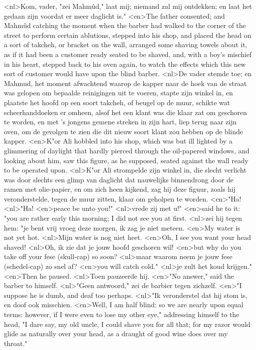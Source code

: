 <nl>Kom, vader, "zei Mahmûd," laat mij; niemand zal mij ontdekken; en laat het gedaan zijn voordat er meer daglicht is."
<en>The father consented; and Mahmûd catching the moment when the barber had walked to the corner of the street to perform certain ablutions, stepped into his shop, and placed the head on a sort of takcheh, or bracket on the wall, arranged some shaving towels about it, as if it had been a customer ready seated to be shaved, and, with a boy's mischief in his heart, stepped back to his oven again, to watch the effects which this new sort of customer would have upon the blind barber.
<nl>De vader stemde toe; en Mahmud, het moment afwachtend waarop de kapper naar de hoek van de straat was gelopen om bepaalde reinigingen uit te voeren, stapte  zijn winkel in, en plaatste het hoofd op een soort takcheh, of beugel op de muur, schikte wat scheerhanddoeken er omheen, alsof het een klant was die klaar zat om geschoren te worden, en met 's jongens gemene streken in zijn hart, liep terug naar zijn oven, om de gevolgen te zien die dit nieuw soort klant zou hebben op de blinde kapper.
<en>K"or Ali hobbled into his shop, which was but ill lighted by a glimmering of daylight that hardly pierced through the oil-papered windows, and looking about him, saw this figure, as he supposed, seated against the wall ready to be operated upon.
<nl>K"or Ali strompelde  zijn winkel in, die slecht verlicht was door slechts een glimp van daglicht dat nauwelijks binnendrong door de ramen met olie-papier, en om zich heen kijkend, zag hij deze figuur, zoals hij veronderstelde, tegen de muur zitten, klaar om geholpen te worden.
<en>"Ha!
<nl>"Ha!
<en>peace be unto you!"
<nl>vrede zij met u!"
<en>said he to it: "you are rather early this morning; I did not see you at first.
<nl>zei hij tegen hem: "je bent vrij vroeg deze morgen, ik zag je niet meteen.
<en>My water is not yet hot.
<nl>Mijn water is nog niet heet.
<en>Oh, I see you want your head shaved!
<nl>Oh, ik zie dat je jouw hoofd geschoren wil!
<en>but why do you take off your fese (skull-cap) so soon?
<nl>maar waarom neem je jouw fese (schedel-cap) zo snel af?
<en>you will catch cold."
<nl>je zult het koud krijgen."
<en>Then he paused.
<nl>Toen pauzeerde hij.
<en>"No answer," said the barber to himself.
<nl>"Geen antwoord," zei de barbier tegen zichzelf.
<en>"I suppose he is dumb, and deaf too perhaps.
<nl>"Ik veronderstel dat hij stom is, en doof ook misschien.
<en>Well, I am half blind: so we are nearly upon equal terms: however, if I were even to lose my other eye," addressing himself to the head, "I dare say, my old uncle, I could shave you for all that; for my razor would glide as naturally over your head, as a draught of good wine does over my throat."
